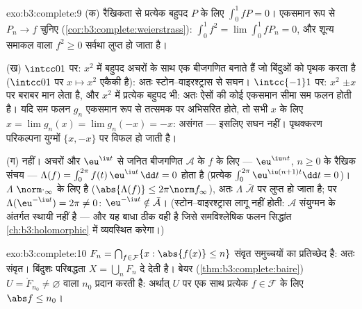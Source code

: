 \begin{solution}{exo:b3:complete:9}
(क) रैखिकता से प्रत्येक बहुपद $P$ के लिए $\int_0^1 fP = 0$। एकसमान रूप से
$P_n \to f$ चुनिए (\cref{cor:b3:complete:weierstrass}): $\int_0^1 f^2 =
\lim\int_0^1 fP_n = 0$, और शून्य समाकल वाला  $f^2 \geq 0$ सर्वथा
लुप्त हो जाता है।

(ख) $\intcc01$ पर: $x^2$ में बहुपद अचरों के साथ एक बीजगणित बनाते हैं जो
बिंदुओं को पृथक करता है ($\intcc01$ पर $x \mapsto x^2$ एकैकी है): अतः स्टोन--वाइरश्ट्रास
से सघन। $\intcc{-1}1$ पर: $x^2$ $\pm x$ पर बराबर मान लेता है, और $x^2$ में
प्रत्येक बहुपद भी: अतः ऐसों की कोई एकसमान सीमा सम फलन होती है। यदि
सम फलन $g_n$ एकसमान रूप से तत्समक पर अभिसरित होते, तो सभी $x$ के
लिए $x = \lim g_n(x) = \lim g_n(-x) = -x$: असंगत --- इसलिए सघन नहीं। पृथक्करण परिकल्पना युग्मों
$\{x, -x\}$ पर विफल हो जाती है।

(ग) नहीं। अचरों और $\eu^{\iu t}$ से जनित बीजगणित $\mathcal A$ के $f$ के लिए ---
$\eu^{\iu nt}$, $n \geq 0$ के रैखिक संचय --- $\Lambda(f) =
\int_0^{2\pi}f(t)\,\eu^{\iu t}\,\dd t = 0$ होता है (प्रत्येक $\int_0^{2\pi}\eu^{\iu(n+1)t}\dd t = 0$)। $\Lambda$
$\norm\cdot_\infty$ के लिए  है ($\abs{\Lambda(f)}\leq
2\pi\norm f_\infty$), अतः $\Lambda$ $\bar{\mathcal
A}$ पर लुप्त हो जाता है;
पर $\Lambda(\eu^{-\iu t}) = 2\pi \neq 0$: $\eu^{-\iu t}
\notin \bar{\mathcal A}$। (स्टोन--वाइरश्ट्रास लागू नहीं होती: $\mathcal A$ संयुग्मन
के अंतर्गत स्थायी नहीं है --- और यह बाधा ठीक वही है जिसे समविश्लेषिक
फलन सिद्धांत \cref{ch:b3:holomorphic} में व्यवस्थित करेगा।)
\end{solution}

\begin{solution}{exo:b3:complete:10}
$F_n = \bigcap_{f \in \mathcal F}\{x : \abs{f(x)} \leq n\}$ संवृत समुच्चयों का प्रतिच्छेद है: अतः संवृत। बिंदुशः परिबद्धता
$X = \bigcup_n F_n$ दे देती है। बेयर (\cref{thm:b3:complete:baire}) $U = \mathring F_{n_0} \neq \varnothing$ वाला $n_0$ प्रदान करती है:
अर्थात् $U$ पर एक साथ प्रत्येक $f \in \mathcal F$ के लिए $\abs f \leq n_0$।
\end{solution}

